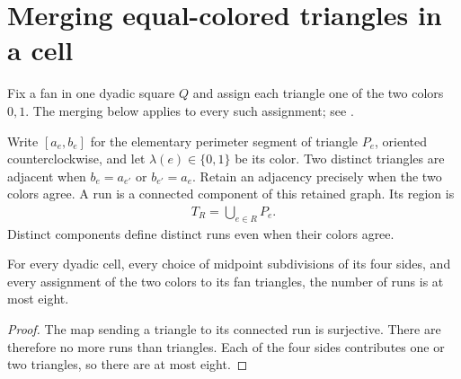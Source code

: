 \section{Merging equal-colored triangles in a cell}
\label{sec:area_law_fan_runs}

Fix a fan in one dyadic square $Q$ and assign each triangle one of the
two colors $0,1$. The merging below applies to every such assignment;
see \cite[Section~11]{OpenAI2026AreaLaw}.


\begin{definition}
    \label{def:area_law_fan_runs}
    \leanok
    Write $[a_e,b_e]$ for the elementary perimeter segment of triangle
    $P_e$, oriented counterclockwise, and let $\lambda(e)\in\{0,1\}$
    be its color. Two distinct triangles are adjacent when
    $b_e=a_{e'}$ or $b_{e'}=a_e$. Retain an adjacency precisely when
    the two colors agree. A run is a connected component of this
    retained graph. Its region is
    \begin{align}
        T_R=\bigcup_{e\in R}P_e.
    \end{align}
    Distinct components define distinct runs even when
    their colors agree.
\end{definition}

\begin{lemma}
    \label{thm:area_law_cell_fan_run_count}
    \leanok
    For every dyadic cell, every choice of midpoint subdivisions of its
    four sides, and every assignment of the two colors to its fan
    triangles, the number of runs is at most eight.
\end{lemma}

\begin{proof}
    \leanok
    The map sending a triangle to its connected run is surjective.
    There are therefore no more runs than triangles. Each of the four
    sides contributes one or two triangles, so there are at most eight.
\end{proof}

